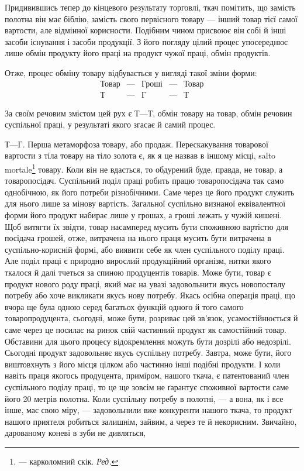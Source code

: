 
Придивившись тепер до кінцевого результату торговлі, ткач
помітить, що замість полотна він має біблію, замість свого первісного
товару — інший товар тієї самої вартости, але відмінної
корисности. Подібним чином присвоює він собі й інші засоби
існування і засоби продукції. З його погляду цілий процес
упосереднює лише обмін продукту його праці на продукт чужої
праці, обмін продуктів.

Отже, процес обміну товару відбувається у вигляді такої зміни
форми:
\[
 \begin{matrix}
  \text{Товар} &—& \text{Гроші} &—& \text{Товар} \\
  Т &—& Г &—& Т
 \end{matrix}
\]

За своїм речовим змістом цей рух є $Т — Т$, обмін товару на
товар, обмін речовин суспільної праці, у результаті якого згасає
й самий процес.

$Т — Г$. Перша метаморфоза товару, або продаж. Перескакування
товарової вартости з тіла товару на тіло золота є, як я
це назвав в іншому місці, salto mortale\footnote*{
— карколомний скік. \emph{Ред.}
} товару. Коли він не
вдасться, то обдурений буде, правда, не товар, а товаропосідач.
Суспільний поділ праці робить працю товаропосідача так само
однобічною, як його потреби різнобічними. Саме через це його
продукт служить для нього лише за мінову вартість. Загальної
суспільно визнаної еквівалентної форми його продукт набирає
лише у грошах, а гроші лежать у чужій кишені. Щоб витягти
їх звідти, товар насамперед мусить бути споживною вартістю
для посідача грошей, отже, витрачена на нього праця мусить
бути витрачена в суспільно-корисній формі, або виявити себе
як член суспільного поділу праці. Але поділ праці є природно
вирослий продукційний організм, нитки якого ткалося й далі
тчеться за спиною продуцентів товарів. Може бути, товар є продукт
нового роду праці, який має на увазі задовольнити якусь
новопосталу потребу або хоче викликати якусь нову потребу.
Якась осібна операція праці, що вчора ще була одною серед
багатьох функцій одного й того самого товаропродуцента, сьогодні,
може бути, розриває цей зв’язок, усамостійнюється й
саме через це посилає на ринок свій частинний продукт як самостійний
товар. Обставини для цього процесу відокремлення можуть
бути дозрілі або недозрілі. Сьогодні продукт задовольняє
якусь суспільну потребу. Завтра, може бути, його виштовхнуть
з його місця цілком або частинно інші подібні продукти. І коли
навіть праця якогось продуцента, приміром, нашого ткача, є
патентований член суспільного поділу праці, то це ще зовсім
не ґарантує споживної вартости саме його 20 метрів полотна.
Коли суспільну потребу в полотні, — а вона, як і все інше, має
свою міру, — задовольнили вже конкуренти нашого ткача, то
продукт нашого приятеля робиться залишнім, зайвим, а через
те й некорисним. Звичайно, дарованому коневі в зуби не дивляться,
\parbreak{}  %
